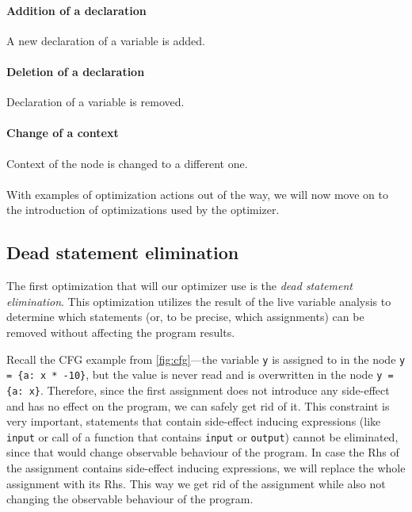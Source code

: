 \documentclass[thesis=M,english]{FITthesis}[2019/12/23]
\begin{document}
\paragraph*{Addition of a declaration} A new declaration of a variable is added.

\paragraph*{Deletion of a declaration} Declaration of a variable is removed.

\paragraph*{Change of a context} Context of the node is changed to a different one.

\paragraph*{} With examples of optimization actions out of the way, we will now move on to the introduction of optimizations used by the optimizer.

\subsection{Dead statement elimination}
The first optimization that will our optimizer use is the \emph{dead statement elimination}. This optimization utilizes the result of the live variable analysis to determine which statements (or, to be precise, which assignments) can be removed without affecting the program results.

Recall the CFG example from \autoref{fig:cfg}---the variable \texttt{y} is assigned to in the node \texttt{y = \{a: x * -10\}}, but the value is never read and is overwritten in the node \texttt{y = \{a: x\}}. Therefore, since the first assignment does not introduce any side-effect and has no effect on the program, we can safely get rid of it. This constraint is very important, statements that contain side-effect inducing expressions (like \texttt{input} or call of a function that contains \texttt{input} or \texttt{output}) cannot be eliminated, since that would change observable behaviour of the program. In case the Rhs of the assignment contains side-effect inducing expressions, we will replace the whole assignment with its Rhs. This way we get rid of the assignment while also not changing the observable behaviour of the program. 
\end{document}
